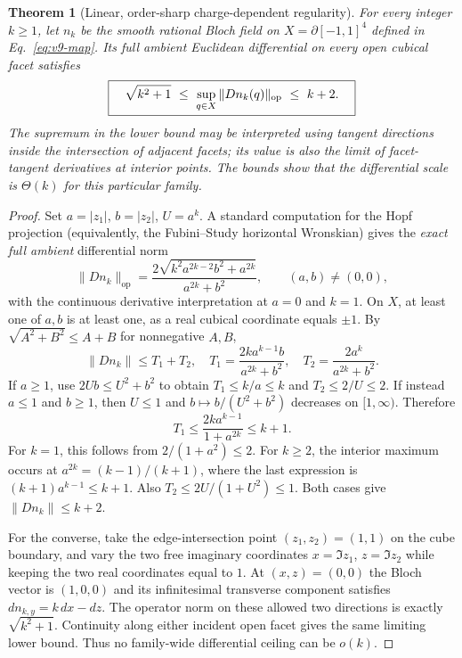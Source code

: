 \documentclass[aps,prd,onecolumn,notitlepage,11pt,superscriptaddress,longbibliography]{revtex4-2}
\newtheorem{theorem}{Theorem}
\begin{document}
\begin{theorem}[Linear, order-sharp charge-dependent regularity]\label{th:v11-linear}
For every integer $k\ge1$, let $n_k$ be the smooth rational Bloch field on $X=\partial[-1,1]^4$ defined in Eq.~\eqref{eq:v9-map}. Its full ambient Euclidean differential on every open cubical facet satisfies
\begin{equation}\label{eq:v11-sandwich}
\boxed{\quad \sqrt{k^2+1}\ \le\ \sup_{q\in X}\|Dn_k(q)\|_{\rm op}\ \le\ k+2.\quad}
\end{equation}
The supremum in the lower bound may be interpreted using tangent directions inside the intersection of adjacent facets; its value is also the limit of facet-tangent derivatives at interior points. The bounds show that the differential scale is $\Theta(k)$ for this particular family.
\end{theorem}
\begin{proof}
Set $a=|z_1|$, $b=|z_2|$, $U=a^k$. A standard computation for the Hopf projection (equivalently, the Fubini--Study horizontal Wronskian) gives the \emph{exact full ambient} differential norm
\begin{equation}\label{eq:v11-wronskian}
\|Dn_k\|_{\mathrm{op}}=\frac{2\sqrt{k^2a^{2k-2}b^2+a^{2k}}}{a^{2k}+b^2},\qquad (a,b)\ne(0,0),
\end{equation}
with the continuous derivative interpretation at $a=0$ and $k=1$. On $X$, at least one of $a,b$ is at least one, as a real cubical coordinate equals $\pm1$. By $\sqrt{A^2+B^2}\le A+B$ for nonnegative $A,B$,
\begin{equation}\label{eq:v11-split}
\|Dn_k\|\le T_1+T_2,
\quad T_1=\frac{2ka^{k-1}b}{a^{2k}+b^2},\quad T_2=\frac{2a^k}{a^{2k}+b^2}.
\end{equation}
If $a\ge1$, use $2Ub\le U^2+b^2$ to obtain $T_1\le k/a\le k$ and $T_2\le2/U\le2$. If instead $a\le1$ and $b\ge1$, then $U\le1$ and $b\mapsto b/(U^2+b^2)$ decreases on $[1,\infty)$. Therefore
\begin{equation}
T_1\le\frac{2k a^{k-1}}{1+a^{2k}}\le k+1.
\end{equation}
For $k=1$, this follows from $2/(1+a^2)\le2$. For $k\ge2$, the interior maximum occurs at $a^{2k}=(k-1)/(k+1)$, where the last expression is $(k+1)a^{k-1}\le k+1$. Also $T_2\le2U/(1+U^2)\le1$. Both cases give $\|Dn_k\|\le k+2$.

For the converse, take the edge-intersection point $(z_1,z_2)=(1,1)$ on the cube boundary, and vary the two free imaginary coordinates $x=\Im z_1$, $z=\Im z_2$ while keeping the two real coordinates equal to $1$. At $(x,z)=(0,0)$ the Bloch vector is $(1,0,0)$ and its infinitesimal transverse component satisfies $dn_{k,y}=k\,dx-dz$. The operator norm on these allowed two directions is exactly $\sqrt{k^2+1}$. Continuity along either incident open facet gives the same limiting lower bound. Thus no family-wide differential ceiling can be $o(k)$.
\end{proof}
\end{document}
